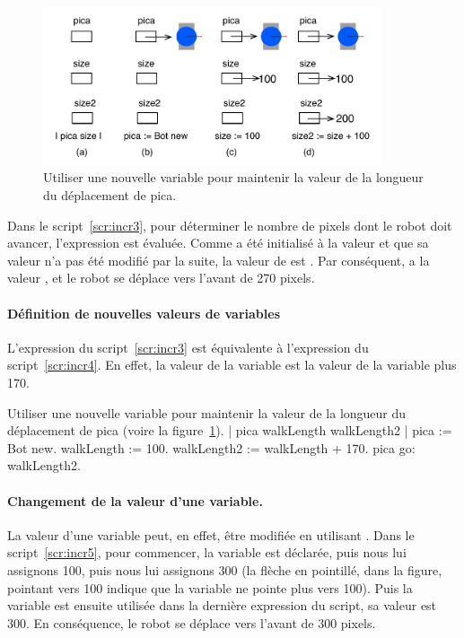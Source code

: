 \documentclass[a4paper,10pt,twoside]{book}
\begin{document}
\begin{figure}[h]
	\centerline{\includegraphics[width=10cm]{boxSize2}}
	\caption{Utiliser une nouvelle variable pour maintenir la valeur de la longueur du d\'eplacement de pica.  
	\label{fig:boxOne3}}
\end{figure}

Dans le script~\ref{scr:incr3}, pour d\'eterminer le nombre de pixels dont le robot doit avancer, l'expression  est \'evalu\'ee. Comme  a \'et\'e initialis\'e \`a la valeur  et que sa valeur n'a pas \'et\'e modifi\'e par la suite, la valeur de  est . Par cons\'equent,  a la valeur , et le robot se d\'eplace vers l'avant de 270 pixels. 

\paragraph{D\'efinition de nouvelles valeurs de variables}
L'expression  du script~\ref{scr:incr3} est \'equivalente \`a l'expression  du script~\ref{scr:incr4}. En effet, la valeur de la variable  est la valeur de la variable  plus 170.

\begin{script}[incr4]{Utiliser une nouvelle variable pour maintenir la valeur de la longueur du d\'eplacement de pica  (voire la figure~\ref{fig:boxOne3}).}
	| pica walkLength walkLength2 | 
	pica := Bot new. 
	walkLength := 100. 
	walkLength2 := walkLength + 170. 
	pica go: walkLength2. 
\end{script}


\paragraph{Changement de la valeur d'une variable.}

La valeur d'une variable peut, en effet, \^etre modifi\'ee en utilisant \ct{:=}. Dans le script~\ref{scr:incr5}, pour commencer, la variable  est d\'eclar\'ee, puis nous lui assignons 100, puis nous lui assignons 300 (la fl\`eche en pointill\'e, dans la figure, pointant vers 100 indique que la variable ne pointe plus vers 100). Puis la variable est ensuite utilis\'ee dans la derni\`ere expression du script, sa valeur est  300. En cons\'equence, le robot se d\'eplace vers l'avant de 300 pixels.
\end{document}

